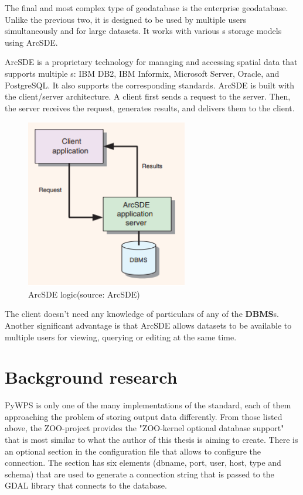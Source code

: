 The final and most complex type of geodatabase is the enterprise
geodatabase. Unlike the previous two, it is designed to be used by
multiple users simultaneously and for large datasets. It works with
various s storage models using ArcSDE.

ArcSDE is a proprietary technology for managing and accessing spatial
data that supports multiple s: IBM DB2, IBM Informix, Microsoft 
Server, Oracle, and PostgreSQL.\cite{arcsdedoc} It also supports the
corresponding standards. ArcSDE is built with the client/server
architecture. A client first sends a request to the server. Then, the
server receives the request, generates results, and delivers them to
the client.

\begin{figure}[H] \centering
      \includegraphics[width=200pt]{./pictures/arcsdeobr.png}
      \caption[ArcSDE logic]{ArcSDE logic(source: ArcSDE)}
      \label{fig:ArcSDE logic}
  \end{figure}

The client doesn't need any knowledge of particulars of any of the
\textbf{DBMS}s. Another significant advantage is that ArcSDE allows datasets to
be available to multiple users for viewing, querying or editing at the
same time.\cite{esritypes}

\section{Background research}


PyWPS is only one of the many implementations of the  standard,
each of them approaching the problem of storing output data
differently. From those listed above, the ZOO-project provides the
"ZOO-kernel optional database support" \cite{zoodb} that is most
similar to what the author of this thesis is aiming to create. There
is an optional section in the configuration file that allows to
configure the connection. The section has six elements (dbname, port,
user, host, type and schema) that are used to generate a connection
string that is passed to the GDAL library that connects to the
database.\cite{zoodbsec}

